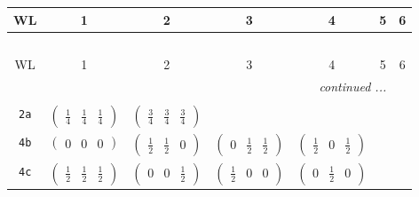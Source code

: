\documentclass[fleqn,9pt,landscape]{jsarticle}
\begin{document}
\begin{center}
\renewcommand{\arraystretch}{1.2}
\begin{longtable}{ccccccc}
 \hline \hline
WL & 1 & 2 & 3 & 4 & 5 & 6 \\ \hline \endfirsthead

\multicolumn{6}{l}{\tablename\ \thetable{}} \\
 \hline \hline
WL & 1 & 2 & 3 & 4 & 5 & 6 \\ \hline \endhead

 \hline \hline
\multicolumn{6}{r}{\footnotesize\it continued ...} \\ \endfoot

 \hline \hline
\multicolumn{6}{r}{} \\ \endlastfoot

{\tt 2a} & $ \begin{pmatrix} \frac{1}{4} & \frac{1}{4} & \frac{1}{4} \end{pmatrix} $ & $ \begin{pmatrix} \frac{3}{4} & \frac{3}{4} & \frac{3}{4} \end{pmatrix} $ & $  $ & $  $ & $  $ & $  $ \\ \hline
{\tt 4b} & $ \begin{pmatrix} 0 & 0 & 0 \end{pmatrix} $ & $ \begin{pmatrix} \frac{1}{2} & \frac{1}{2} & 0 \end{pmatrix} $ & $ \begin{pmatrix} 0 & \frac{1}{2} & \frac{1}{2} \end{pmatrix} $ & $ \begin{pmatrix} \frac{1}{2} & 0 & \frac{1}{2} \end{pmatrix} $ & $  $ & $  $ \\ \hline
{\tt 4c} & $ \begin{pmatrix} \frac{1}{2} & \frac{1}{2} & \frac{1}{2} \end{pmatrix} $ & $ \begin{pmatrix} 0 & 0 & \frac{1}{2} \end{pmatrix} $ & $ \begin{pmatrix} \frac{1}{2} & 0 & 0 \end{pmatrix} $ & $ \begin{pmatrix} 0 & \frac{1}{2} & 0 \end{pmatrix} $ & $  $ & $  $ \\ \hline

\end{longtable}
\end{center}
\end{document}

